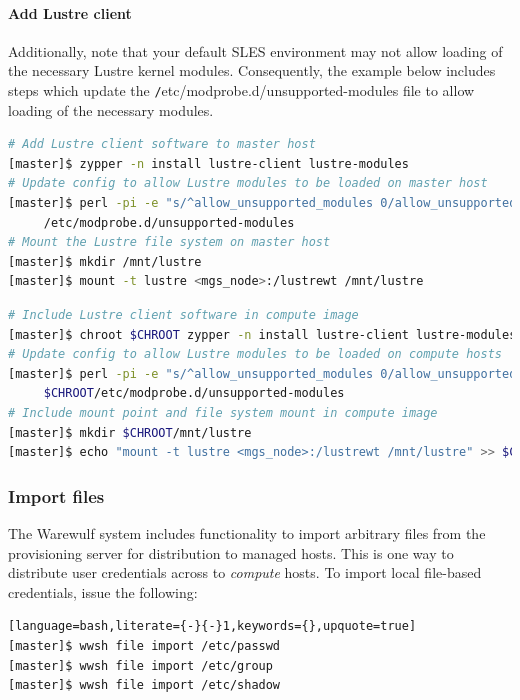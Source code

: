 \documentclass[letterpaper]{article}
\begin{document}
\paragraph{Add Lustre client} 


 Additionally, note that your default SLES environment
  may not allow loading of the necessary Lustre kernel modules. Consequently,
  the example below includes steps which update the {\texttt
    /etc/modprobe.d/unsupported-modules} file to allow loading of the necessary
  modules.

\begin{lstlisting}[language=bash,keywords={},upquote=true]
# Add Lustre client software to master host
[master]$ zypper -n install lustre-client lustre-modules
# Update config to allow Lustre modules to be loaded on master host
[master]$ perl -pi -e "s/^allow_unsupported_modules 0/allow_unsupported_modules 1/" \
     /etc/modprobe.d/unsupported-modules
# Mount the Lustre file system on master host
[master]$ mkdir /mnt/lustre
[master]$ mount -t lustre <mgs_node>:/lustrewt /mnt/lustre
\end{lstlisting}

\begin{lstlisting}[language=bash,keywords={},upquote=true]
# Include Lustre client software in compute image
[master]$ chroot $CHROOT zypper -n install lustre-client lustre-modules
# Update config to allow Lustre modules to be loaded on compute hosts
[master]$ perl -pi -e "s/^allow_unsupported_modules 0/allow_unsupported_modules 1/" \
     $CHROOT/etc/modprobe.d/unsupported-modules
# Include mount point and file system mount in compute image
[master]$ mkdir $CHROOT/mnt/lustre
[master]$ echo "mount -t lustre <mgs_node>:/lustrewt /mnt/lustre" >> $CHROOT/etc/fstab
\end{lstlisting}

\subsubsection{Import files} \label{sec:file_import}

The Warewulf system includes functionality to import arbitrary files from the
provisioning server for distribution to managed hosts. This is one way
to distribute user credentials across to {\em compute} hosts. To
import local file-based credentials, issue the following:

\begin{lstlisting}[language=bash,literate={-}{-}1,keywords={},upquote=true]
[master]$ wwsh file import /etc/passwd                                                                                                       
[master]$ wwsh file import /etc/group
[master]$ wwsh file import /etc/shadow 
\end{lstlisting}
\end{document}
